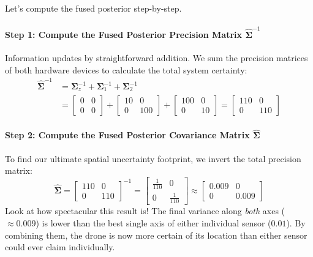 \documentclass{article}
\begin{document}
Let's compute the fused posterior step-by-step.

\paragraph{Step 1: Compute the Fused Posterior Precision Matrix $\hat{\boldsymbol{\Sigma}}^{-1}$}
Information updates by straightforward addition. We sum the precision matrices of both hardware devices to calculate the total system certainty:
\begin{align}
\hat{\boldsymbol{\Sigma}}^{-1} &= \boldsymbol{\Sigma}_z^{-1} + \boldsymbol{\Sigma}_1^{-1} + \boldsymbol{\Sigma}_2^{-1} \nonumber \\
&= \begin{bmatrix} 0 & 0 \\ 0 & 0 \end{bmatrix} + \begin{bmatrix} 10 & 0 \\ 0 & 100 \end{bmatrix} + \begin{bmatrix} 100 & 0 \\ 0 & 10 \end{bmatrix} = \begin{bmatrix} 110 & 0 \\ 0 & 110 \end{bmatrix} \tag{71}
\end{align}

\paragraph{Step 2: Compute the Fused Posterior Covariance Matrix $\hat{\boldsymbol{\Sigma}}$}
To find our ultimate spatial uncertainty footprint, we invert the total precision matrix:
\begin{equation}
\hat{\boldsymbol{\Sigma}} = \begin{bmatrix} 110 & 0 \\ 0 & 110 \end{bmatrix}^{-1} = \begin{bmatrix} \frac{1}{110} & 0 \\ 0 & \frac{1}{110} \end{bmatrix} \approx \begin{bmatrix} 0.009 & 0 \\ 0 & 0.009 \end{bmatrix} \tag{72}
\end{equation}
Look at how spectacular this result is! The final variance along \textit{both} axes ($\approx 0.009$) is lower than the best single axis of either individual sensor ($0.01$). By combining them, the drone is now more certain of its location than either sensor could ever claim individually.
\end{document}
